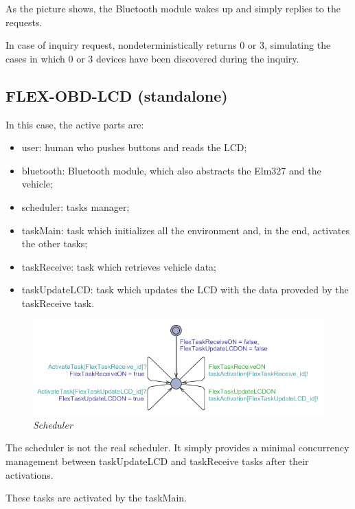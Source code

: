 \documentclass[paper=a4, fontsize=11pt]{scrartcl} %
\numberwithin{equation}{section} %
\numberwithin{figure}{section} %
\numberwithin{table}{section} %
\begin{document}
As the picture shows, the Bluetooth module wakes up and simply replies to the requests.

In case of inquiry request, nondeterministically returns 0 or 3, simulating the cases in which 0 or 3 devices have been discovered during the inquiry.

\subsection{FLEX-OBD-LCD (standalone)}

In this case, the active parts are:

\begin{itemize}
	\item user: human who pushes buttons and reads the LCD;
	\item bluetooth: Bluetooth module, which also abstracts the Elm327 and the vehicle;
	\item scheduler: tasks manager;
	\item taskMain: task which initializes all the environment and, in the end, activates the other tasks;
	\item taskReceive: task which retrieves vehicle data;
	\item taskUpdateLCD: task which updates the LCD with the data proveded by the taskReceive task.
\end{itemize}

\begin{figure}[H]
  \centering
  \includegraphics[width=6in]{img/FLEX-OBD-LCD_scheduler}
  \caption{\textit{Scheduler}}
\end{figure}

The scheduler is not the real scheduler. It simply provides a minimal concurrency management between taskUpdateLCD and taskReceive tasks after their activations.

These tasks are activated by the taskMain.
\end{document}
